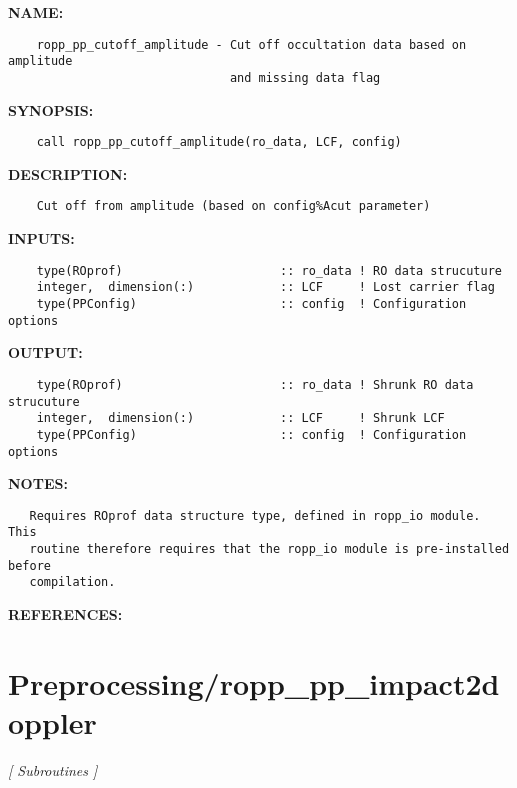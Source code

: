 \label{ch:robo73}
\label{ch:Preprocessing_ropp_pp_cutoff_amplitude}
\textbf{NAME:}\hspace{0.08in}\begin{Verbatim}
    ropp_pp_cutoff_amplitude - Cut off occultation data based on amplitude
                               and missing data flag
\end{Verbatim}
\textbf{SYNOPSIS:}\hspace{0.08in}\begin{Verbatim}
    call ropp_pp_cutoff_amplitude(ro_data, LCF, config)
\end{Verbatim}
\textbf{DESCRIPTION:}\hspace{0.08in}\begin{Verbatim}
    Cut off from amplitude (based on config%Acut parameter)
\end{Verbatim}
\textbf{INPUTS:}\hspace{0.08in}\begin{Verbatim}
    type(ROprof)                      :: ro_data ! RO data strucuture
    integer,  dimension(:)            :: LCF     ! Lost carrier flag
    type(PPConfig)                    :: config  ! Configuration options
\end{Verbatim}
\textbf{OUTPUT:}\hspace{0.08in}\begin{Verbatim}
    type(ROprof)                      :: ro_data ! Shrunk RO data strucuture
    integer,  dimension(:)            :: LCF     ! Shrunk LCF
    type(PPConfig)                    :: config  ! Configuration options
\end{Verbatim}
\textbf{NOTES:}\hspace{0.08in}\begin{Verbatim}
   Requires ROprof data structure type, defined in ropp_io module. This
   routine therefore requires that the ropp_io module is pre-installed before
   compilation.
\end{Verbatim}
\textbf{REFERENCES:}\hspace{0.08in}\section{Preprocessing/ropp\_pp\_impact2doppler}
\textsl{[ Subroutines ]}

